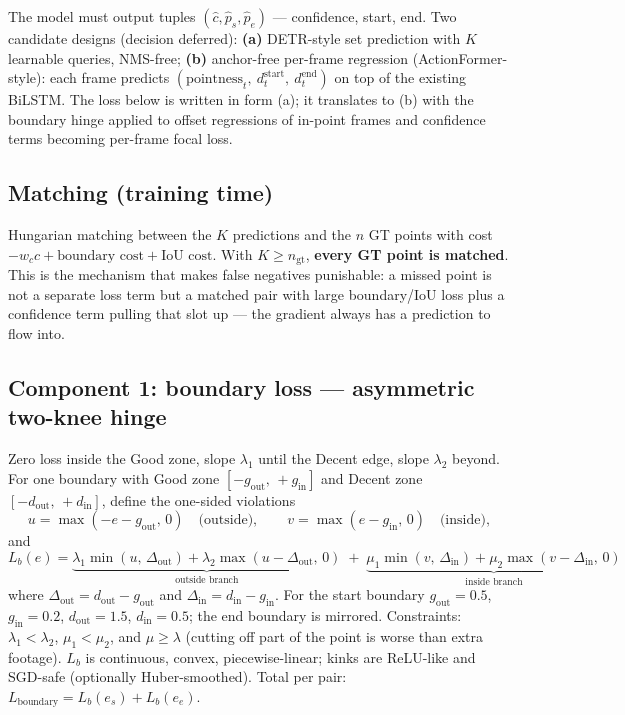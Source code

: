 \documentclass[11pt]{article}
\begin{document}
The model must output tuples $(\hat{c}, \hat{p}_s, \hat{p}_e)$ --- confidence, start, end.
Two candidate designs (decision deferred): \textbf{(a)} DETR-style set prediction with $K$
learnable queries, NMS-free; \textbf{(b)} anchor-free per-frame regression
(ActionFormer-style): each frame predicts $(\text{pointness}_t,\ d^{\text{start}}_t,\
d^{\text{end}}_t)$ on top of the existing BiLSTM. The loss below is written in form (a);
it translates to (b) with the boundary hinge applied to offset regressions of in-point
frames and confidence terms becoming per-frame focal loss.

\subsection{Matching (training time)}

Hungarian matching between the $K$ predictions and the $n$ GT points with cost
$-w_c \hat{c} + \text{boundary cost} + \text{IoU cost}$. With $K \ge n_{\mathrm{gt}}$,
\textbf{every GT point is matched}. This is the mechanism that makes false negatives
punishable: a missed point is not a separate loss term but a matched pair with large
boundary/IoU loss plus a confidence term pulling that slot up --- the gradient always has
a prediction to flow into.

\subsection{Component 1: boundary loss --- asymmetric two-knee hinge}

Zero loss inside the Good zone, slope $\lambda_1$ until the Decent edge, slope
$\lambda_2$ beyond. For one boundary with Good zone $[-g_{\text{out}},\, +g_{\text{in}}]$
and Decent zone $[-d_{\text{out}},\, +d_{\text{in}}]$, define the one-sided violations
\[
u = \max(-e - g_{\text{out}},\, 0) \quad \text{(outside)}, \qquad
v = \max(e - g_{\text{in}},\, 0) \quad \text{(inside)},
\]
and
\[
L_b(e) =
\underbrace{\lambda_1 \min(u,\, \Delta_{\text{out}})
 + \lambda_2 \max(u - \Delta_{\text{out}},\, 0)}_{\text{outside branch}}
\;+\;
\underbrace{\mu_1 \min(v,\, \Delta_{\text{in}})
 + \mu_2 \max(v - \Delta_{\text{in}},\, 0)}_{\text{inside branch}}
\]
where $\Delta_{\text{out}} = d_{\text{out}} - g_{\text{out}}$ and
$\Delta_{\text{in}} = d_{\text{in}} - g_{\text{in}}$. For the start boundary
$g_{\text{out}}{=}0.5$, $g_{\text{in}}{=}0.2$, $d_{\text{out}}{=}1.5$,
$d_{\text{in}}{=}0.5$; the end boundary is mirrored. Constraints:
$\lambda_1 < \lambda_2$, $\mu_1 < \mu_2$, and $\mu \ge \lambda$ (cutting off part of the
point is worse than extra footage). $L_b$ is continuous, convex, piecewise-linear; kinks
are ReLU-like and SGD-safe (optionally Huber-smoothed). Total per pair:
$L_{\text{boundary}} = L_b(e_s) + L_b(e_e)$.
\end{document}
